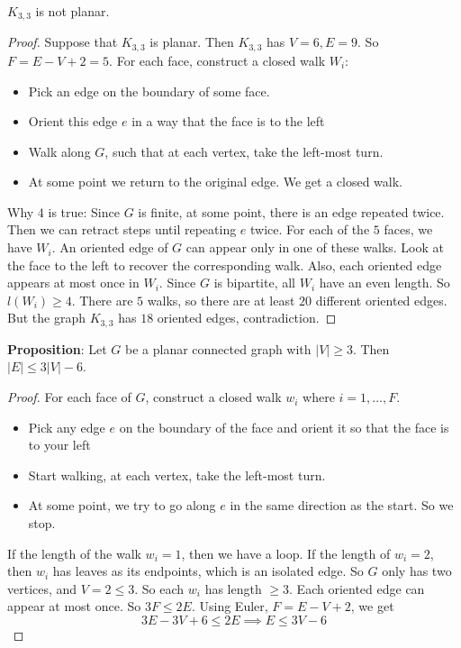 \documentclass{report}
\begin{document}
\begin{theorem}{}
    $K_{3, 3}$ is not planar.
\end{theorem}
    \begin{proof}
        Suppose that $K_{3, 3}$ is planar. Then $K_{3, 3}$ has $V = 6, E = 9$. So $F = E - V + 2 = 5$. For each face, construct a closed walk $W_{i}$:
            \begin{itemize}
                \item Pick an edge on the boundary of some face.

                \item Orient this edge $e$ in a way that the face is to the left

                \item Walk along $G$, such that at each vertex, take the left-most turn.

                \item At some point we return to the original edge. We get a closed walk.
            \end{itemize}
        Why $4$ is true: Since $G$ is finite, at some point, there is an edge repeated twice. Then we can retract steps until repeating $e$ twice. For each of the $5$ faces, we have $W_{i}$. An oriented edge of $G$ can appear only in one of these walks. Look at the face to the left to recover the corresponding walk. Also, each oriented edge appears at most once in $W_{i}$. Since $G$ is bipartite, all $W_{i}$ have an even length. So $l(W_{i}) \geq 4$. There are $5$ walks, so there are at least $20$ different oriented edges. But the graph $K_{3, 3}$ has $18$ oriented edges, contradiction.
    \end{proof}

\textbf{Proposition}: Let $G$ be a planar connected graph with $\lvert V \rvert \geq 3$. Then $\lvert E \rvert \leq 3\lvert V \rvert - 6$.
    \begin{proof}
        For each face of $G$, construct a closed walk $w_{i}$ where $i = 1, \ldots, F$.
            \begin{itemize}
                \item Pick any edge $e$ on the boundary of the face and orient it so that the face is to your left

                \item Start walking, at each vertex, take the left-most turn.

                \item At some point, we try to go along $e$ in the same direction as the start. So we stop. 
            \end{itemize}
        If the length of the walk $w_{i} = 1$, then we have a loop. If the length of $w_{i} = 2$, then $w_{i}$ has leaves as its endpoints, which is an isolated edge. So $G$ only has two vertices, and $V = 2 \leq 3$. So each $w_{i}$ has length $\geq 3$. Each oriented edge can appear at most once. So $3F \leq 2E$. Using Euler, $F = E  - V + 2$, we get
            \begin{equation*}
                3E - 3V + 6 \leq 2E \implies E \leq 3V - 6
            \end{equation*}
    \end{proof}
\end{document}
